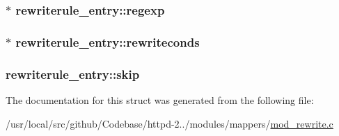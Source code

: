 \subsubsection[{\texorpdfstring{regexp}{regexp}}]{$\ast$ rewriterule\+\_\+entry\+::regexp}\hypertarget{structrewriterule__entry_a5c57f5015a78ac9dd4eccf1ca14be1ab}{}\label{structrewriterule__entry_a5c57f5015a78ac9dd4eccf1ca14be1ab}
\subsubsection[{\texorpdfstring{rewriteconds}{rewriteconds}}]{$\ast$ rewriterule\+\_\+entry\+::rewriteconds}\hypertarget{structrewriterule__entry_ae7b990eebac0e60bb10713c4fed86682}{}\label{structrewriterule__entry_ae7b990eebac0e60bb10713c4fed86682}
\subsubsection[{\texorpdfstring{skip}{skip}}]{ rewriterule\+\_\+entry\+::skip}\hypertarget{structrewriterule__entry_a699b7289aa9e10b8874b6536ae3dd242}{}\label{structrewriterule__entry_a699b7289aa9e10b8874b6536ae3dd242}


The documentation for this struct was generated from the following file\+:\begin{DoxyCompactItemize}
\item 
/usr/local/src/github/\+Codebase/httpd-\/2../modules/mappers/\hyperlink{mod__rewrite_8c}{mod\+\_\+rewrite.\+c}\end{DoxyCompactItemize}
